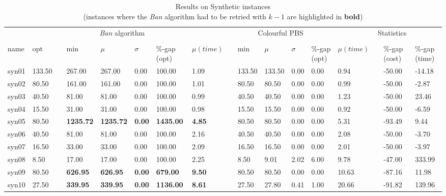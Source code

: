 \begin{table}[H]
    \caption{Results on Synthetic instances\\\scriptsize{(instances where the \emph{Ban} algorithm had to be retried with $k-1$ are highlighted in \textbf{bold})}}\label{table:synthetic_cost}
    \tiny
    \begin{tabularx}{\textwidth}{XXlXXXXXlXXXXXlXX}
    \firsthline
    \multicolumn{2}{c}{Instance}& \hspace{0.25em} & \multicolumn{5}{c}{\emph{Ban} algorithm}& \hspace{0.25em} & \multicolumn{5}{c}{Colourful PBS}& \hspace{0.25em} & \multicolumn{2}{c}{Statistics}\\
    \cline{1-2} \cline{4-8} \cline{10-14} \cline{16-17}\\
    name & opt && min & $\mu$ & $\sigma$ & \%-gap (opt) & $\mu (time)$ && min & $\mu$ & $\sigma$ & \%-gap (opt) & $\mu (time)$ && \%-gap (cost) & \%-gap (time)\\
    \hline
    syn01 & 133.50 && 267.00 & 267.00 & 0.00 & 100.00 & 1.09 && 133.50 & 133.50 & 0.00 & 0.00 & 0.94 && -50.00 & -14.18\\
    syn02 & 80.50 && 161.00 & 161.00 & 0.00 & 100.00 & 1.01 && 80.50 & 80.50 & 0.00 & 0.00 & 0.99 && -50.00 & -2.87\\
    syn03 & 40.50 && 81.00 & 81.00 & 0.00 & 100.00 & 0.99 && 40.50 & 40.50 & 0.00 & 0.00 & 1.23 && -50.00 & 23.46\\
    syn04 & 15.50 && 31.00 & 31.00 & 0.00 & 100.00 & 0.98 && 15.50 & 15.50 & 0.00 & 0.00 & 0.92 && -50.00 & -6.59\\
    syn05 & 80.50 && \textbf{1235.72} & \textbf{1235.72} & \textbf{0.00} & \textbf{1435.00} & \textbf{4.85} && 80.50 & 80.50 & 0.00 & 0.00 & 5.31 && -93.49 & 9.44\\
    syn06 & 40.50 && 81.00 & 81.00 & 0.00 & 100.00 & 2.16 && 40.50 & 40.50 & 0.00 & 0.00 & 2.08 && -50.00 & -3.70\\
    syn07 & 16.50 && 33.00 & 33.00 & 0.00 & 100.00 & 2.09 && 16.50 & 16.50 & 0.00 & 0.00 & 2.01 && -50.00 & -3.97\\
    syn08 & 8.50 && 17.00 & 17.00 & 0.00 & 100.00 & 2.25 && 8.50 & 9.01 & 2.02 & 6.00 & 9.78 && -47.00 & 333.99\\
    syn09 & 80.50 && \textbf{626.95} & \textbf{626.95} & \textbf{0.00} & \textbf{679.00} & \textbf{9.50} && 80.50 & 80.50 & 0.00 & 0.00 & 10.63 && -87.16 & 11.98\\
    syn10 & 27.50 && \textbf{339.95} & \textbf{339.95} & \textbf{0.00} & \textbf{1136.00} & \textbf{8.61} && 27.50 & 27.80 & 0.41 & 1.00 & 20.66 && -91.82 & 139.96\\

\end{tabularx}
\end{table}
